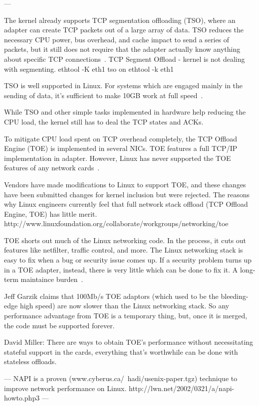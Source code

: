 ---

The kernel already supports TCP segmentation offloading (TSO),
where an adapter can create TCP packets out of a large array of data.
TSO reduces the necessary CPU power, bus overhead, and cache impact to send a series of packets,
but it still does not require that the adapter actually know
anything about specific TCP connections~\cite{linux-and-tcp-offload-engines}.
TCP Segment Offload - kernel is not dealing with segmenting.
ethtool -K eth1 tso on
ethtool -k eth1

TSO is well supported in Linux.
For systems which are engaged mainly in the sending of data,
it's sufficient to make 10GB work at full speed~\cite{jls2009-gro}.


While TSO and other simple tasks implemented in hardware help reducing the CPU load,
the kernel still has to deal the TCP states and ACKs.

To mitigate CPU load spent on TCP overhead completely, the TCP Offload Engine (TOE) is implemented in several NICs.
TOE features a full TCP/IP implementation in adapter.
However, Linux has never supported the TOE features of any network cards~\cite{linux-and-tcp-offload-engines}.

Vendors have made modifications to Linux to support TOE, and these changes have been submitted changes for kernel inclusion but were rejected.
The reasons why Linux engineers currently feel that full network stack offload (TCP Offload Engine, TOE) has little merit.
http://www.linuxfoundation.org/collaborate/workgroups/networking/toe

TOE shorts out much of the Linux networking code.
In the process, it cuts out features like netfilter, traffic control, and more.
The Linux networking stack is easy to fix when a bug or security issue comes up. If a security problem turns up in a TOE adapter, instead, there is very little which can be done to fix it.
A long-term maintaince burden~\cite{linux-and-tcp-offload-engines}.

Jeff Garzik claims that 100Mb/s TOE adaptors
(which used to be the bleeding-edge high speed)
are now slower than the Linux networking stack.
So any performance advantage from TOE is a temporary thing, but, once it is merged, the code must be supported forever.

David Miller: There are ways to obtain TOE's performance without
necessitating stateful support in the cards, everything that's
worthwhile can be done with stateless offloads.

---
NAPI is a proven (www.cyberus.ca/~hadi/usenix-paper.tgz) technique
to improve network performance on Linux.
http://lwn.net/2002/0321/a/napi-howto.php3
---


